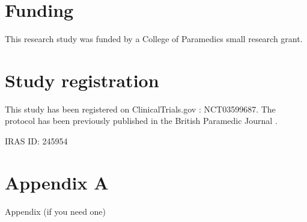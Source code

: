 \documentclass[]{article}
\begin{document}
\hypertarget{funding}{%
\section{Funding}\label{funding}}

This research study was funded by a College of Paramedics small research
grant.

\hypertarget{study-registration}{%
\section{Study registration}\label{study-registration}}

This study has been registered on ClinicalTrials.gov : NCT03599687. The
protocol has been previously published in the British Paramedic Journal
\citep{pilbery_soiled_2018}.

IRAS ID: 245954

\hypertarget{appendix-a}{%
\section{Appendix A}\label{appendix-a}}

Appendix (if you need one)


\end{document}
